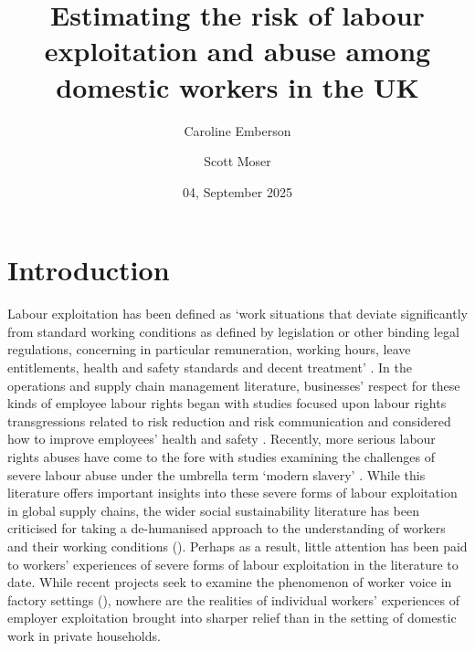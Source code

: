 \documentclass[
  12pt,
  letterpaper,
  DIV=11,
  numbers=noendperiod]{scrartcl}
\title{Estimating the risk of labour exploitation and abuse among
domestic workers in the UK}
\author{Caroline Emberson \and Scott Moser}
\date{04, September 2025}
\theoremstyle{plain}
\theoremstyle{definition}
\renewcommand*\contentsname{Table of contents}
\newcommand\contentsname{Table of contents}
\begin{document}
\maketitle

\renewcommand*\contentsname{Table of contents}
{
\hypersetup{linkcolor=}
\setcounter{tocdepth}{3}
\tableofcontents
}

\newpage

\section{Introduction}\label{introduction}

Labour exploitation has been defined as `work situations that deviate
significantly from standard working conditions as defined by legislation
or other binding legal regulations, concerning in particular
remuneration, working hours, leave entitlements, health and safety
standards and decent treatment'
\autocite[10]{european_union_for_fundamental_rights_severe_2015}. In the
operations and supply chain management literature, businesses' respect
for these kinds of employee labour rights began with studies focused
upon labour rights transgressions related to risk reduction and risk
communication and considered how to improve employees' health and safety
\autocite{chinander_aligning_2001,wolf_operationalizing_2001}. Recently,
more serious labour rights abuses have come to the fore with studies
examining the challenges of severe labour abuse under the umbrella term
`modern slavery'
\autocite{gold_modern_2015,new_modern_2015,benstead_horizontal_2018,stevenson_modern_2018}.
While this literature offers important insights into these severe forms
of labour exploitation in global supply chains, the wider social
sustainability literature has been criticised for taking a de-humanised
approach to the understanding of workers and their working conditions
(\textcite{soundararajan_humanizing_2021}). Perhaps as a result, little
attention has been paid to workers' experiences of severe forms of
labour exploitation in the literature to date. While recent projects
seek to examine the phenomenon of worker voice in factory settings
(\textcite{leverhulme_trust_research_2022}), nowhere are the realities
of individual workers' experiences of employer exploitation brought into
sharper relief than in the setting of domestic work in private
households.
\end{document}
